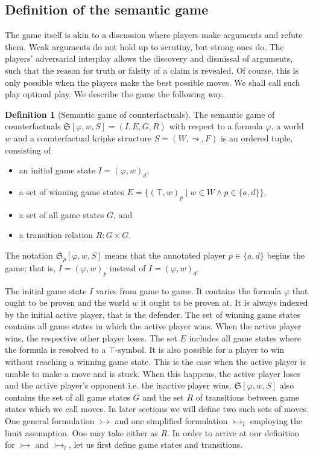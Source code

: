 \documentclass[a4paper,american]{paper}
\theoremstyle{definition}\newtheorem{definition}{Definition}
\begin{document}
\subsection{Definition of the semantic game}
The game itself is akin to a discussion where players make arguments and refute them. Weak arguments do not hold up to scrutiny, but strong ones do. The players' adversarial interplay allows the discovery and dismissal of arguments, such that the reason for truth or falsity of a claim is revealed. Of course, this is only possible when the players make the best possible moves. We shall call such play optimal play. We describe the game the following way.
\begin{definition}[Semantic game of counterfactuals]
The semantic game of counterfactuals $\mathfrak{S}[\varphi ,w,S]=(I, E, G, R)$ with respect to a formula $\varphi$, a world $w$ and a counterfactual kripke structure $S=(W,\leadsto ,F)$ is an ordered tuple, consisting of
\begin{itemize}
\item an initial game state $I=(\varphi ,w)_d$,
\item a set of winning game states $E=\{(\top ,w)_p \mid w\in W\wedge p\in\{ a,d\}\}$,
\item a set of all game states $G$, and
\item a transition relation $R: G\times G$.
\end{itemize}
The notation $\mathfrak{S}_p[\varphi ,w,S]$ means that the annotated player $p\in\{a,d\}$ begins the game; that is, $I=(\varphi ,w)_p$ instead of $I=(\varphi ,w)_d$.
\end{definition}
The initial game state $I$ varies from game to game. It contains the formula $\varphi$ that ought to be proven and the world $w$ it ought to be proven at. It is always indexed by the initial active player, that is the defender. The set of winning game states contains all game states in which the active player wins. When the active player wins, the respective other player loses. The set $E$ includes all game states where the formula is resolved to a $\top$-symbol. It is also possible for a player to win without reaching a winning game state. This is the case when the active player is unable to make a move and is stuck. When this happens, the active player loses and the active player's opponent i.e. the inactive player wins. $\mathfrak{S}[\varphi ,w,S]$ also contains the set of all game states $G$ and the set $R$ of transitions between game states which we call moves. In later sections we will define two such sets of moves. One general formulation $\rightarrowtail$ and one simplified formulation $\rightarrowtail_l$ employing the limit assumption. One may take either as $R$. In order to arrive at our definition for $\rightarrowtail$ and $\rightarrowtail_l$, let us first define game states and transitions.
\end{document}
